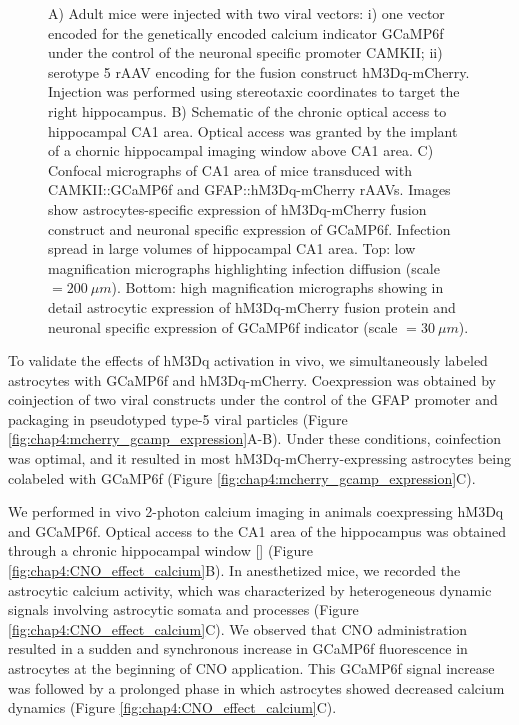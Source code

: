 \begin{figure}[h!]
{    A) Adult mice were injected with two viral vectors: i) one vector encoded for the genetically encoded calcium indicator GCaMP6f under the control of the neuronal specific promoter CAMKII; ii) serotype 5 rAAV encoding for the fusion construct hM3Dq-mCherry. 
    Injection was performed using stereotaxic coordinates to target the right hippocampus. 
    B) Schematic of the chronic optical access to hippocampal CA1 area. 
    Optical access was granted by the implant of a chornic hippocampal imaging window above CA1 area. 
    C) Confocal micrographs of CA1 area of mice transduced with CAMKII::GCaMP6f and GFAP::hM3Dq-mCherry rAAVs. 
    Images show astrocytes-specific expression of hM3Dq-mCherry fusion construct and neuronal specific expression of GCaMP6f. 
    Infection spread in large volumes of hippocampal CA1 area. 
    Top: low magnification micrographs highlighting infection diffusion (scale $= 200\ \mu m$). 
    Bottom: high magnification micrographs showing in detail astrocytic expression of hM3Dq-mCherry fusion protein and neuronal specific expression of GCaMP6f indicator (scale $= 30\ \mu m$).}
    \label{fig:chap4:Pedro_fig5}
\end{figure}

To validate the effects of hM3Dq activation in vivo, we simultaneously labeled astrocytes with GCaMP6f and hM3Dq-mCherry. 
Coexpression was obtained by coinjection of two viral constructs under the control of the GFAP promoter and packaging in pseudotyped type-5 viral particles (Figure \ref{fig:chap4:mcherry_gcamp_expression}A-B). 
Under these conditions, coinfection was optimal, and it resulted in most hM3Dq-mCherry-expressing astrocytes being colabeled with GCaMP6f (Figure \ref{fig:chap4:mcherry_gcamp_expression}C).

We performed in vivo 2-photon calcium imaging in animals coexpressing hM3Dq and GCaMP6f. 
Optical access to the CA1 area of the hippocampus was obtained through a chronic hippocampal window [\cite{dombeck2010}] (Figure \ref{fig:chap4:CNO_effect_calcium}B). 
In anesthetized mice, we recorded the astrocytic calcium activity, which was characterized by heterogeneous dynamic signals involving astrocytic somata and processes (Figure \ref{fig:chap4:CNO_effect_calcium}C). 
We observed that CNO administration resulted in a sudden and synchronous increase in GCaMP6f fluorescence in astrocytes at the beginning of CNO application. 
This GCaMP6f signal increase was followed by a prolonged phase in which astrocytes showed decreased calcium dynamics (Figure \ref{fig:chap4:CNO_effect_calcium}C).

